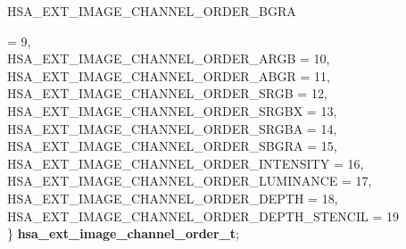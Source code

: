 \documentclass[final,oneside]{book}
\newcommand{\reftyp}[1]{#1}
\newcommand{\refenu}[1]{\reftyp{#1}}
\newenvironment{mylongtable}{\rowcolors{0}{lightgray}{lightgray}\longtable} {
\endlongtable}
\begin{document}
\begin{mylongtable}{@{}p{\textwidth}}
\hspace{1.7em}\hypertarget{group__ext-images_1ggabaced4fb1f3b9fdaa978e143af5ff055a8f8724381ae9dfe592a15808ebe8c1d2}{\refenu{HSA_\-EXT_\-IMAGE_\-CHANNEL_\-ORDER_\-BGRA}} = 9,\\
\hspace{1.7em}\hypertarget{group__ext-images_1ggabaced4fb1f3b9fdaa978e143af5ff055a7a49085ae07e467293c0a10d003a2356}{\refenu{HSA_\-EXT_\-IMAGE_\-CHANNEL_\-ORDER_\-ARGB}} = 10,\\
\hspace{1.7em}\hypertarget{group__ext-images_1ggabaced4fb1f3b9fdaa978e143af5ff055a8fd833428ebe3e1428e0001115ec6880}{\refenu{HSA_\-EXT_\-IMAGE_\-CHANNEL_\-ORDER_\-ABGR}} = 11,\\
\hspace{1.7em}\hypertarget{group__ext-images_1ggabaced4fb1f3b9fdaa978e143af5ff055a64dbb297ed7cf48f525ffe32aa653319}{\refenu{HSA_\-EXT_\-IMAGE_\-CHANNEL_\-ORDER_\-SRGB}} = 12,\\
\hspace{1.7em}\hypertarget{group__ext-images_1ggabaced4fb1f3b9fdaa978e143af5ff055a38d8f1c70900f6646df6a6d20746f840}{\refenu{HSA_\-EXT_\-IMAGE_\-CHANNEL_\-ORDER_\-SRGBX}} = 13,\\
\hspace{1.7em}\hypertarget{group__ext-images_1ggabaced4fb1f3b9fdaa978e143af5ff055ae9980a3013f42e7d56f4fd28ea8c3b7c}{\refenu{HSA_\-EXT_\-IMAGE_\-CHANNEL_\-ORDER_\-SRGBA}} = 14,\\
\hspace{1.7em}\hypertarget{group__ext-images_1ggabaced4fb1f3b9fdaa978e143af5ff055a2617e3d26bbf6dd3c136534dcf5e4594}{\refenu{HSA_\-EXT_\-IMAGE_\-CHANNEL_\-ORDER_\-SBGRA}} = 15,\\
\hspace{1.7em}\hypertarget{group__ext-images_1ggabaced4fb1f3b9fdaa978e143af5ff055a5fb131f53f229f55456287a009da9b6e}{\refenu{HSA_\-EXT_\-IMAGE_\-CHANNEL_\-ORDER_\-INTENSITY}} = 16,\\
\hspace{1.7em}\hypertarget{group__ext-images_1ggabaced4fb1f3b9fdaa978e143af5ff055a5576d6ae7fd07c21fa8196c4323f1476}{\refenu{HSA_\-EXT_\-IMAGE_\-CHANNEL_\-ORDER_\-LUMINANCE}} = 17,\\
\hspace{1.7em}\hypertarget{group__ext-images_1ggabaced4fb1f3b9fdaa978e143af5ff055ad26aef84eb00f1d1e9defc45f7508e50}{\refenu{HSA_\-EXT_\-IMAGE_\-CHANNEL_\-ORDER_\-DEPTH}} = 18,\\
\hspace{1.7em}\hypertarget{group__ext-images_1ggabaced4fb1f3b9fdaa978e143af5ff055aa1c158a53efa2619ceefa748f3d99a99}{\refenu{HSA_\-EXT_\-IMAGE_\-CHANNEL_\-ORDER_\-DEPTH_\-STENCIL}} = 19\\
\} \hypertarget{group__ext-images_1gabaced4fb1f3b9fdaa978e143af5ff055}{\textbf{hsa_\-ext_\-image_\-channel_\-order_\-t}};\rule[-2ex]{0pt}{0pt}\end{mylongtable}
\end{document}
